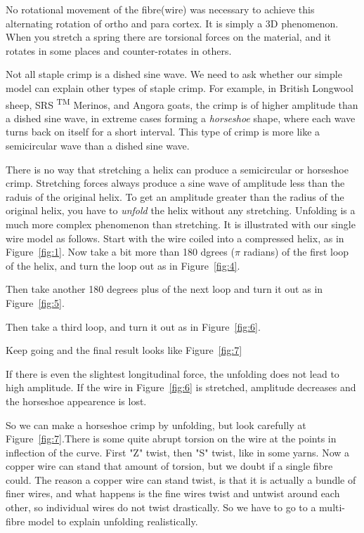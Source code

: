 \documentclass[titlepage,10pt]{article}  %
\begin{document}


No rotational movement of the fibre(wire) was necessary to achieve this alternating rotation of ortho and para cortex. It is simply a 3D phenomenon. When you stretch a spring there are torsional forces on the material, and it rotates in some places and counter-rotates in others.

Not all staple crimp is a dished sine wave. We need to ask whether our simple model can explain other types of staple crimp. For example, in British Longwool sheep, SRS \textsuperscript{TM} Merinos, and Angora goats, the crimp is of higher amplitude than a dished sine wave, in extreme cases forming a {\em horseshoe} shape, where each wave turns back on itself for a short interval. This type of crimp is more like a semicircular wave than a dished sine wave.

There is no way that stretching a helix can produce a semicircular or horseshoe crimp. Stretching forces always produce a sine wave of amplitude less than the raduis of the original helix. To get an amplitude greater than the radius of the original helix, you have to {\em unfold} the helix without any stretching. Unfolding is a much more complex phenomenon than stretching. It is illustrated with our single wire model as follows. Start with the wire coiled into a compressed helix, as in Figure~\ref{fig:1}. Now take a bit more than 180 dgrees ($\pi$ radians) of the first loop of the helix, and turn the loop out as in Figure~\ref{fig:4}.



Then take another 180 degrees plus of the next loop and turn it out as in Figure~\ref{fig:5}.



Then take a third loop, and turn it out as in Figure~\ref{fig:6}.



Keep going and the final result looks like Figure~\ref{fig:7}



If there is even the slightest longitudinal force, the unfolding does not lead to high amplitude. If the wire in Figure~\ref{fig:6} is stretched, amplitude decreases and the horseshoe appearence is lost.

So we can make a horseshoe crimp by unfolding, but look carefully at Figure~\ref{fig:7}.There is some quite abrupt torsion on the wire at the points in inflection of the curve. First "Z" twist, then "S" twist, like in some yarns. Now a copper wire can stand that amount of torsion, but we doubt if a single fibre could. The reason a copper wire can stand twist, is that it is actually a bundle of finer wires, and what happens is the fine wires twist and untwist around each other, so individual wires do not twist drastically. So we have to go to a multi-fibre model to explain unfolding realistically.
\end{document}
